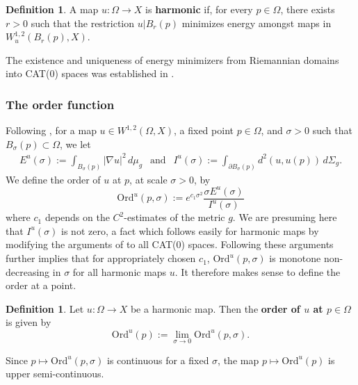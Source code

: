 \documentclass[12pt]{amsart}
\theoremstyle{definition}
\newtheorem{definition}[theorem]{Definition}
\numberwithin{equation}{section}
\begin{document}
\begin{definition}\label{mindef} 
A  map $u:\Omega \rightarrow X$ is {\bf harmonic} if, for every $p \in \Omega$, there exists $r>0$ such that  the restriction $u|B_r(p)$  
minimizes energy amongst maps in
$W^{1,2}_u(B_r(p),X)$.
\end{definition} The existence and uniqueness of energy minimizers from Riemannian domains into CAT(0) spaces was established in \cite{korevaar-schoen1}.


\subsubsection{The order function}


Following \cite{gromov-schoen}, for a map $u\in W^{1,2}(\Omega , X)$, a fixed point $p \in \Omega$, and $\sigma >0$ such that $B_\sigma(p) \subset \Omega$,  we let 
\begin{align*}
E^u(\sigma):= \int_{B_\sigma(p)}|\nabla u|^2 \, d\mu_g \ \
\mbox{ and } \ \
I^u(\sigma):= \int_{\partial B_\sigma(p)}d^2(u, u(p))\, d\Sigma_g.
\end{align*}
We define the order of $u$ at $p$, at scale $\sigma>0$, by
\begin{equation}\label{eq:ordscale}
\text{Ord}^u(p,\sigma):=e^{c_1 \sigma^2} \frac{\sigma E^u(\sigma)}{I^u(\sigma)}
\end{equation}where $c_1$ depends on the $C^2$-estimates of the metric $g$. We are presuming here that $I^u(\sigma)$ is not zero, a fact which follows easily for harmonic maps by modifying the arguments of \cite[Section 2]{gromov-schoen} to all CAT(0) spaces. Following these arguments further implies that for appropriately chosen $c_1$, $\text{Ord}^u(p,\sigma)$ is monotone non-decreasing in $\sigma$ for all harmonic maps $u$. It therefore makes sense to define the order at a point.





\begin{definition}
Let $u:\Omega \to X$ be a harmonic map. Then the {\bf order of $u$ at $p \in \Omega$} is given by
\[
\text{Ord}^u(p):= \lim_{\sigma \to 0}\text{Ord}^u(p,\sigma).
\]
\end{definition}
Since $p \mapsto \text{Ord}^u(p, \sigma)$ is continuous for a fixed $\sigma$, the map $p \mapsto \text{Ord}^u(p)$ is upper semi-continuous. 
\end{document}
